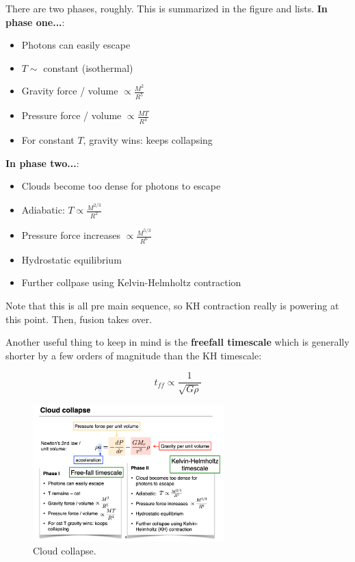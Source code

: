 \documentclass{article}
\begin{document}
There are two phases, roughly. This is summarized in the figure and lists. \textbf{In phase one...}:

\begin{itemize}
    \item Photons can easily escape
    \item $T\sim$ constant (isothermal)
    \item Gravity force / volume $\propto \frac{M^2}{R^5}$
    \item Pressure force / volume $\propto \frac{MT}{R^4}$
    \item For constant $T$, gravity wins: keeps collapsing
\end{itemize}

\textbf{In phase two...}:

\begin{itemize}
    \item Clouds become too dense for photons to escape
    \item Adiabatic: $T\propto \frac{M^{2/3}}{R^2}$
    \item Pressure force increases $\propto \frac{M^{5/3}}{R^6}$
    \item Hydrostatic equilibrium
    \item Further collpase using Kelvin-Helmholtz contraction
\end{itemize}

Note that this is all pre main sequence, so KH contraction really is powering at this point. Then, fusion takes over. 

Another useful thing to keep in mind is the \textbf{freefall timescale} which is generally shorter by a few orders of magnitude than the KH timescale:

\begin{equation}
    t_{ff} \propto \frac{1}{\sqrt{G\rho}}
\end{equation}

\begin{figure}
    \centering
    \includegraphics[width=0.66\textwidth]{figs/Screen Shot 2021-09-24 at 3.34.04 PM.png}
    \caption{Cloud collapse.}
    \label{fig:cloud_collapse}
\end{figure}
\end{document}
